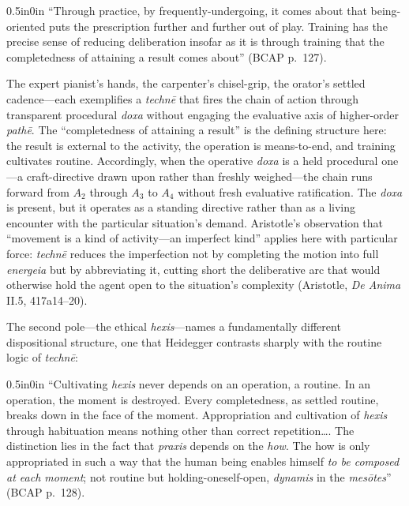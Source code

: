 \begin{adjustwidth}{0.5in}{0in}
``Through practice, by frequently-undergoing, it comes about that being-oriented puts the prescription further and further out of play. Training has the precise sense of reducing deliberation insofar as it is through training that the completedness of attaining a result comes about'' (BCAP p.~127).
\end{adjustwidth}

The expert pianist's hands, the carpenter's chisel-grip, the orator's settled cadence---each exemplifies a \textit{technē} that fires the chain of action through transparent procedural \textit{doxa} without engaging the evaluative axis of higher-order \textit{pathē}. The ``completedness of attaining a result'' is the defining structure here: the result is external to the activity, the operation is means-to-end, and training cultivates routine. Accordingly, when the operative \textit{doxa} is a held procedural one---a craft-directive drawn upon rather than freshly weighed---the chain runs forward from $A_2$ through $A_3$ to $A_4$ without fresh evaluative ratification. The \textit{doxa} is present, but it operates as a standing directive rather than as a living encounter with the particular situation's demand. Aristotle's observation that ``movement is a kind of activity---an imperfect kind'' applies here with particular force: \textit{technē} reduces the imperfection not by completing the motion into full \textit{energeia} but by abbreviating it, cutting short the deliberative arc that would otherwise hold the agent open to the situation's complexity (Aristotle, \textit{De Anima} II.5, 417a14--20).

The second pole---the ethical \textit{hexis}---names a fundamentally different dispositional structure, one that Heidegger contrasts sharply with the routine logic of \textit{technē}:

\begin{adjustwidth}{0.5in}{0in}
``Cultivating \textit{hexis} never depends on an operation, a routine. In an operation, the moment is destroyed. Every completedness, as settled routine, breaks down in the face of the moment. Appropriation and cultivation of \textit{hexis} through habituation means nothing other than correct repetition\ldots. The distinction lies in the fact that \textit{praxis} depends on the \textit{how}. The how is only appropriated in such a way that the human being enables himself \textit{to be composed at each moment}; not routine but holding-oneself-open, \textit{dynamis} in the \textit{mesōtes}'' (BCAP p.~128).
\end{adjustwidth}

